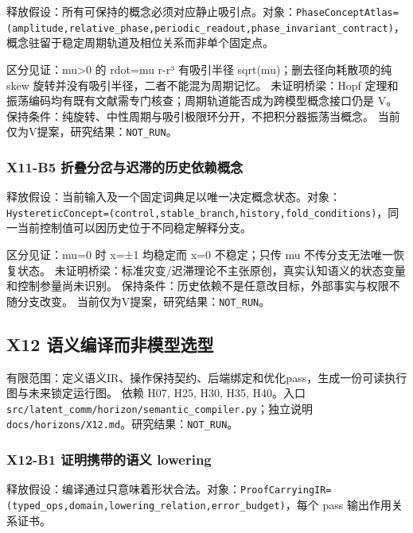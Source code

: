\documentclass[
  10pt,
]{article}
\begin{document}
释放假设：所有可保持的概念必须对应静止吸引点。对象：\nolinkurl{PhaseConceptAtlas=(amplitude,relative_phase,periodic_readout,phase_invariant_contract)}，概念驻留于稳定周期轨道及相位关系而非单个固定点。

区分见证：mu\textgreater{}0 的 rdot=mu r-r³ 有吸引半径
sqrt(mu)；删去径向耗散项的纯 skew
旋转并没有吸引半径，二者不能混为周期记忆。 未证明桥梁：Hopf
定理和振荡编码均有既有文献需专门核查；周期轨道能否成为跨模型概念接口仍是
V。 保持条件：纯旋转、中性周期与吸引极限环分开，不把积分器振荡当概念。
当前仅为V提案，研究结果：\nolinkurl{NOT_RUN}。

\subsubsection{X11-B5
折叠分岔与迟滞的历史依赖概念}\label{x11-b5-ux6298ux53e0ux5206ux5c94ux4e0eux8fdfux6edeux7684ux5386ux53f2ux4f9dux8d56ux6982ux5ff5}

释放假设：当前输入及一个固定词典足以唯一决定概念状态。对象：\nolinkurl{HystereticConcept=(control,stable_branch,history,fold_conditions)}，同一当前控制值可以因历史位于不同稳定解释分支。

区分见证：mu=0 时 x=±1 均稳定而 x=0 不稳定；只传 mu
不传分支无法唯一恢复状态。
未证明桥梁：标准灾变/迟滞理论不主张原创，真实认知语义的状态变量和控制参量尚未识别。
保持条件：历史依赖不是任意改目标，外部事实与权限不随分支改变。
当前仅为V提案，研究结果：\nolinkurl{NOT_RUN}。

\subsection{X12
语义编译而非模型选型}\label{x12-ux8bedux4e49ux7f16ux8bd1ux800cux975eux6a21ux578bux9009ux578b}

有限范围：定义语义IR、操作保持契约、后端绑定和优化pass，生成一份可读执行图与未来锁定运行图。
依赖 H07, H25, H30, H35, H40。入口
{\small\nolinkurl{src/latent_comm/horizon/semantic_compiler.py}}；独立说明
{\small\nolinkurl{docs/horizons/X12.md}}。研究结果：\nolinkurl{NOT_RUN}。

\subsubsection{X12-B1 证明携带的语义
lowering}\label{x12-b1-ux8bc1ux660eux643aux5e26ux7684ux8bedux4e49-lowering}

释放假设：编译通过只意味着形状合法。对象：\nolinkurl{ProofCarryingIR=(typed_ops,domain,lowering_relation,error_budget)}，每个
pass 输出作用关系证书。
\end{document}
